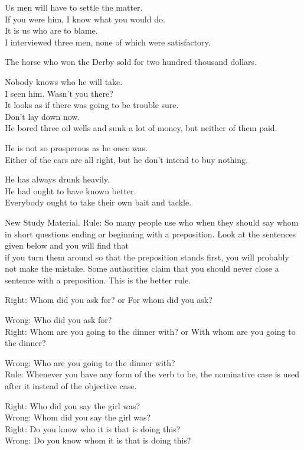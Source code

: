 \documentclass[10pt]{article}
\begin{document}
Us men will have to settle the matter.\\
If you were him, I know what you would do.\\
It is us who are to blame.\\
I interviewed three men, none of which were satisfactory.

The horse who won the Derby sold for two hundred thousand dollars.

Nobody knows who he will take.\\
I seen him. Wasn't you there?\\
It looks as if there was going to be trouble sure.\\
Don't lay down now.\\
He bored three oil wells and sunk a lot of money, but neither of them paid.

He is not so prosperous as he once was.\\
Either of the cars are all right, but he don't intend to buy nothing.

He has always drunk heavily.\\
He had ought to have known better.\\
Everybody ought to take their own bait and tackle.

New Study Material. Rule: So many people use who when they should say whom in short questions ending or beginning with a preposition. Look at the sentences given below and you will find that\\
if you turn them around so that the preposition stands first, you will probably not make the mistake. Some authorities claim that you should never close a sentence with a preposition. This is the better rule.

Right: Whom did you ask for? or For whom did you ask?

Wrong: Who did you ask for?\\
Right: Whom are you going to the dinner with? or With whom are you going to the dinner?

Wrong: Who are you going to the dinner with?\\
Rule: Whenever you have any form of the verb to be, the nominative case is used after it instead of the objective case.

Right: Who did you say the girl was?\\
Wrong: Whom did you say the girl was?\\
Right: Do you know who it is that is doing this?\\
Wrong: Do you know whom it is that is doing this?
\end{document}
